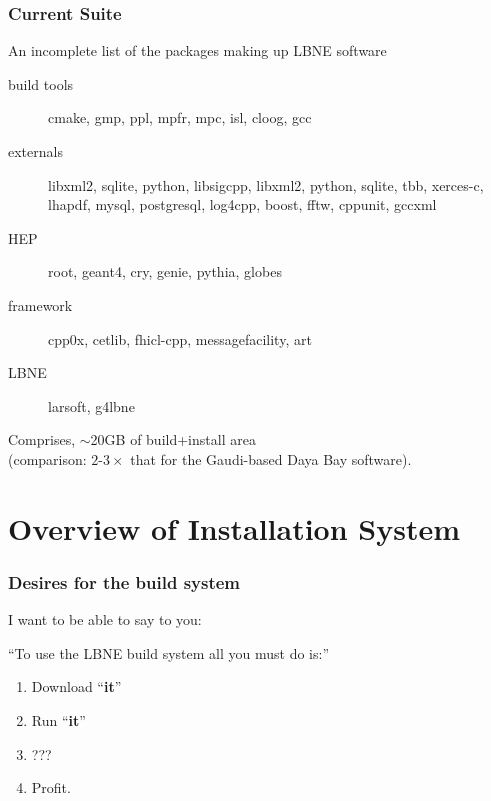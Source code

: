 \documentclass[xcolor=dvipsnames]{beamer}
\begin{document}
\begin{frame}
  \frametitle{Current Suite}
  An incomplete list of the packages making up LBNE software
  \begin{description}
  \item[build tools] cmake, gmp, ppl, mpfr, mpc, isl, cloog, gcc
  \item[externals] libxml2, sqlite, python, libsigcpp, libxml2, python, sqlite, tbb, xerces-c, lhapdf, mysql, postgresql, log4cpp, boost, fftw, cppunit, gccxml
  \item[HEP] root, geant4, cry, genie, pythia, globes
  \item[framework] cpp0x, cetlib, fhicl-cpp, messagefacility, art
  \item[LBNE] larsoft, g4lbne
  \end{description}
  Comprises, $\sim$20GB of build+install area \\
  (comparison: $2\mbox{-}3\times$ that for the Gaudi-based Daya Bay software).
\end{frame}

\section{Overview of Installation System}


\begin{frame}
  \frametitle{Desires for the build system}
  I want to be able to say to you:

  ``To use the LBNE build system all you must do is:''
  \vspace{5mm}
  \begin{enumerate}
  \item Download ``\textbf{it}''
  \item Run ``\textbf{it}''
  \item ???
  \item Profit.
  \end{enumerate}
  
\end{frame}
\end{document}
